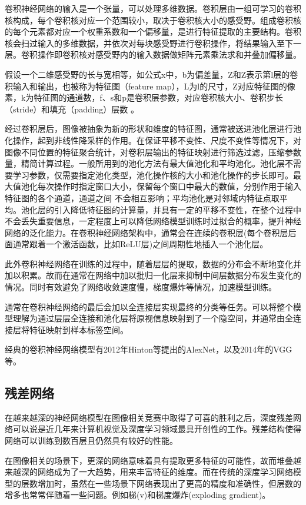 卷积神经网络的输入是一个张量，可以处理多维数据。卷积层由一组可学习的卷积核构成，每个卷积核对应一个范围较小，取决于卷积核大小的感受野。组成卷积核的每个元素都对应一个权重系数和一个偏移量，是进行特征提取的主要结构。卷积核会扫过输入的多维数据，并依次对每块感受野进行卷积操作，将结果输入至下一层。卷积操作即卷积核对感受野内的输入数据做矩阵元素乘法求和并叠加偏移量。

假设一个二维感受野的长与宽相等，如公式x中，b为偏差量，Z和Z表示第l层的卷积输入和输出，也被称为特征图（feature map），L为l的尺寸，Z对应特征图的像素，k为特征图的通道数，f、s和p是卷积层参数，对应卷积核大小、卷积步长（stride）和填充（padding）层数 。

经过卷积层后，图像被抽象为新的形状和维度的特征图，通常被送进池化层进行池化操作，起到非线性降采样的作用。在保证平移不变性、尺度不变性等情况下，对图像不同位置的特征聚合统计，对卷积层输出的特征映射进行筛选过滤，压缩参数量，精简计算过程。一般所用到的池化方法有最大值池化和平均池化。池化层不需要学习参数，仅需要指定池化类型，池化操作核的大小和池化操作的步长即可。最大值池化每次操作时指定窗口大小，保留每个窗口中最大的数值，分别作用于输入特征图的各个通道，通道之间 不会相互影响；平均池化是对邻域内特征点取平均。池化层的引入降低特征图的计算量，并具有一定的平移不变性，在整个过程中不会丢失重要信息，一定程度上可以降低网络模型训练时过拟合的概率，提升神经网络的泛化能力。在卷积神经网络架构中，通常会在连续的卷积层(每个卷积层后面通常跟着一个激活函数，比如ReLU层)之间周期性地插入一个池化层。

此外卷积神经网络在训练的过程中，随着层层的提取，数据的分布会不断地变化并加以积累。故而在通常在网络中加以批归一化层来抑制中间层数据分布发生变化的情况。同时有效避免了网络收敛速度慢，梯度爆炸等情况，加速模型训练。

通常在卷积神经网络的最后会加以全连接层实现最终的分类等任务。可以将整个模型理解为通过层层全连接和池化层将原视信息映射到了一个隐空间，并通常由全连接层将特征映射到样本标签空间。

经典的卷积神经网络模型有2012年Hinton等提出的AlexNet，以及2014年的VGG等。



\subsection{残差网络}{}

在越来越深的神经网络模型在图像相关竞赛中取得了可喜的胜利之后，深度残差网络可以说是近几年来计算机视觉及深度学习领域最具开创性的工作。残差结构使得网络可以训练到数百层且仍然具有较好的性能。

在图像相关的场景下，更深的网络意味着具有提取更多特征的可能性，故而堆叠越来越深的网络成为了一大趋势，用来丰富特征的维度。而在传统的深度学习网络模型的层数增加时，虽然在一些场景下网络表现出了更高的精度和准确性，但层数的增多也常常伴随着一些问题。例如梯(v)和梯度爆炸(exploding gradient)。


